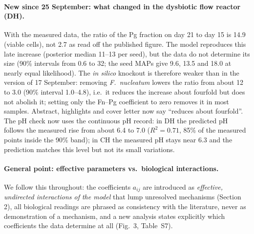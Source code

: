 \documentclass[11pt,a4paper]{article}
\begin{document}
\paragraph{New since 25 September: what changed in the dysbiotic flow reactor (DH).}
With the measured data, the ratio of the Pg fraction on day 21 to day 15 is 14.9 (viable cells), not 2.7 as read off the published figure.
The model reproduces this late increase (posterior median 11--13 per seed), but the data do not determine its size (90\% intervals from 0.6 to 32; the seed MAPs give 9.6, 13.5 and 18.0 at nearly equal likelihood).
The \textit{in silico} knockout is therefore weaker than in the version of 17 September: removing \textit{F.~nucleatum} lowers the ratio from about 12 to 3.0 (90\% interval 1.0--4.8), i.e.\ it reduces the increase about fourfold but does not abolish it; setting only the Fn--Pg coefficient to zero removes it in most samples.
Abstract, highlights and cover letter now say ``reduces about fourfold''.
The pH check now uses the continuous pH record: in DH the predicted pH follows the measured rise from about 6.4 to 7.0 ($R^2=0.71$, 85\% of the measured points inside the 90\% band); in CH the measured pH stays near 6.3 and the prediction matches this level but not its small variations.

\paragraph{General point: effective parameters vs.\ biological interactions.}
We follow this throughout: the coefficients $a_{ij}$ are introduced as \emph{effective, undirected interactions of the model} that lump unresolved mechanisms (Section 2), all biological readings are phrased as consistency with the literature, never as demonstration of a mechanism, and a new analysis states explicitly which coefficients the data determine at all (Fig.~3, Table~S7).
\end{document}
